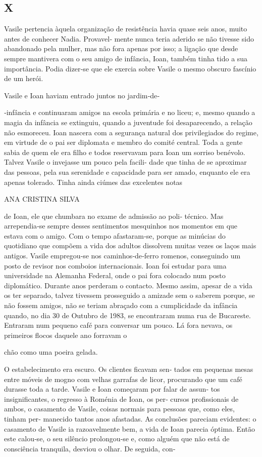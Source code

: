 \subsection{X}

Vasile pertencia àquela organização de resistência havia quase seis
anos, muito antes de conhecer Nadia. Provavel‑ mente nunca teria aderido
se não tivesse sido abandonado pela mulher, mas não fora apenas por
isso; a ligação que desde sempre mantivera com o seu amigo de infância,
Ioan, também tinha tido a sua importância. Podia dizer‑se que ele
exercia sobre Vasile o mesmo obscuro fascínio de um herói.

Vasile e Ioan haviam entrado juntos no jardim‑de‑

‑infância e continuaram amigos na escola primária e no liceu; e, mesmo
quando a magia da infância se extinguiu, quando a juventude foi
desaparecendo, a relação não esmoreceu. Ioan nascera com a segurança
natural dos privilegiados do regime, em virtude de o pai ser diplomata e
membro do comité central. Toda a gente sabia de quem ele era filho e
todos reservavam para Ioan um sorriso benévolo. Talvez Vasile o
invejasse um pouco pela facili‑ dade que tinha de se aproximar das
pessoas, pela sua serenidade e capacidade para ser amado, enquanto ele
era apenas tolerado. Tinha ainda ciúmes das excelentes notas

ANA CRISTINA SILVA

de Ioan, ele que chumbara no exame de admissão ao poli‑ técnico. Mas
arrependia‑se sempre desses sentimentos mesquinhos nos momentos em que
estava com o amigo. Com o tempo afastaram‑se, porque as minúcias do
quotidiano que compõem a vida dos adultos dissolvem muitas vezes os
laços mais antigos. Vasile empregou‑se nos caminhos‑de‑ferro romenos,
conseguindo um posto de revisor nos comboios internacionais. Ioan foi
estudar para uma universidade na Alemanha Federal, onde o pai fora
colocado num posto diplomático. Durante anos perderam o contacto. Mesmo
assim, apesar de a vida os ter separado, talvez tivessem prosseguido a
amizade sem o saberem porque, se não fossem amigos, não se teriam
abraçado com a cumplicidade da infância quando, no dia 30 de Outubro de
1983, se encontraram numa rua de Bucareste. Entraram num pequeno café
para conversar um pouco. Lá fora nevava, os primeiros flocos daquele ano
forravam o

chão como uma poeira gelada.

O estabelecimento era escuro. Os clientes ficavam sen‑ tados em pequenas
mesas entre móveis de mogno com velhas garrafas de licor, procurando que
um café durasse toda a tarde. Vasile e Ioan começaram por falar de
assun‑ tos insignificantes, o regresso à Roménia de Ioan, os per‑ cursos
profissionais de ambos, o casamento de Vasile, coisas normais para
pessoas que, como eles, tinham per‑ manecido tantos anos afastadas. As
conclusões pareciam evidentes: o casamento de Vasile ia razoavelmente
bem, a vida de Ioan parecia óptima. Então este calou‑se, o seu silêncio
prolongou‑se e, como alguém que não está de consciência tranquila,
desviou o olhar. De seguida, con‑

